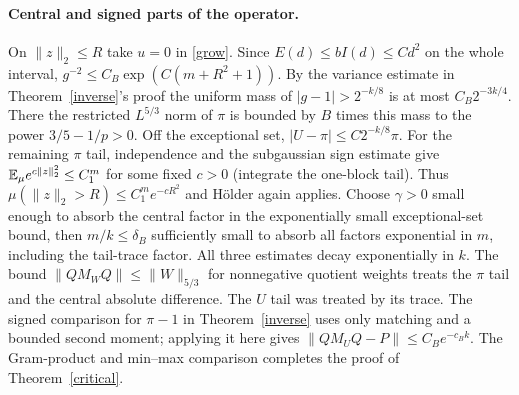 \paragraph{Central and signed parts of the operator.}
On $\|z\|_2\le R$ take $u=0$ in \eqref{grow}. Since $E(d)\le b I(d)\le C d^2$ on the whole interval, $g^{-2}\le C_B\exp(C(m+R^2+1))$. By the variance estimate in Theorem~\ref{inverse}'s proof the uniform mass of $|g-1|>2^{-k/8}$ is at most $C_B2^{-3k/4}$. There the restricted $L^{5/3}$ norm of $\pi$ is bounded by $B$ times this mass to the power $3/5-1/p>0$. Off the exceptional set, $|U-\pi|\le C2^{-k/8}\pi$. For the remaining $\pi$ tail, independence and the subgaussian sign estimate give $\mathbb E_\mu e^{c\|z\|_2^2}\le C_1^m$ for some fixed $c>0$ (integrate the one-block tail). Thus $\mu(\|z\|_2>R)\le C_1^m e^{-cR^2}$ and H\"older again applies.
Choose $\gamma>0$ small enough to absorb the central factor in the exponentially small exceptional-set bound, then $m/k\le\delta_B$ sufficiently small to absorb all factors exponential in $m$, including the tail-trace factor. All three estimates decay exponentially in $k$. The bound $\|QM_WQ\|\le\|W\|_{5/3}$ for nonnegative quotient weights treats the $\pi$ tail and the central absolute difference. The $U$ tail was treated by its trace. The signed comparison for $\pi-1$ in Theorem~\ref{inverse} uses only matching and a bounded second moment; applying it here gives $\|QM_UQ-P\|\le C_Be^{-c_B k}$. The Gram-product and min--max comparison completes the proof of Theorem~\ref{critical}.
